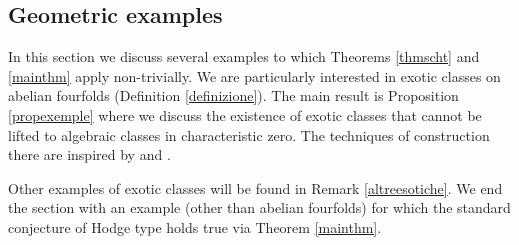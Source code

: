\documentclass[11pt]{amsart}
\begin{document}
\begin{appendices}

\section{Geometric examples}\label{geometricexamples}
In this section we discuss several examples to which Theorems \ref{thmscht} and \ref{mainthm} apply non-trivially. We are  particularly interested in exotic classes on abelian fourfolds (Definition \ref{definizione}). The main result is Proposition \ref{propexemple} where we discuss the existence of exotic classes that cannot be lifted to algebraic classes in characteristic zero. The techniques of construction there are inspired by \cite{LeOo} and
 \cite{Zah}. 
 
  Other examples of exotic classes will be found  in Remark \ref{altreesotiche}. We end the section with an example (other than abelian fourfolds) for which the standard conjecture of Hodge type holds true via Theorem \ref{mainthm}.
 


\end{appendices}
\end{document}
